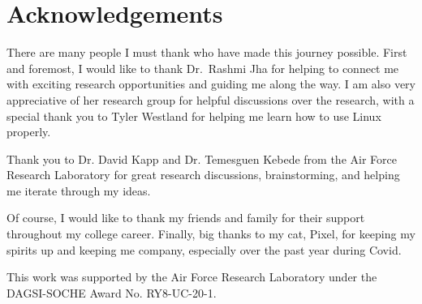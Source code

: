 \documentclass[../stegner_thesis.tex]{subfiles}
\begin{document}
\chapter*{Acknowledgements}%
\label{ch:ack}

\par There are many people I must thank who have made this journey possible.
First and foremost, I would like to thank Dr.\ Rashmi Jha for helping to
connect me with exciting research opportunities and guiding me along the way.
I am also very appreciative of her research group for helpful discussions over
the research, with a special thank you to Tyler Westland for helping me learn
how to use Linux properly.

\par Thank you to Dr\@. David Kapp and Dr\@. Temesguen Kebede from the Air
Force Research Laboratory for great research discussions, brainstorming, and
helping me iterate through my ideas.

\par Of course, I would like to thank my friends and family for their support
throughout my college career.
Finally, big thanks to my cat, Pixel, for keeping my spirits up and keeping me
company, especially over the past year during Covid.

\par This work was supported by the Air Force Research Laboratory under the
DAGSI-SOCHE Award No. RY8-UC-20-1.

\newpage
\end{document}
